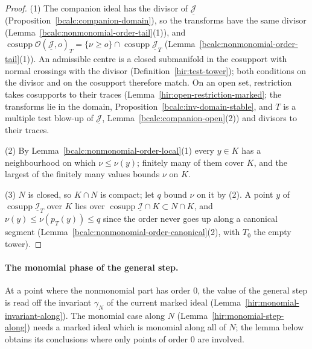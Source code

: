 \begin{proof}
\mixedleanok
(1) The companion ideal has the divisor of \(\underline{\mathcal J}\) (Proposition~\ref{bcalc:companion-domain}), so the transforms have the same divisor
(Lemma~\ref{bcalc:nonmonomial-order-tail}(1)), and \(\operatorname{cosupp}\mathcal O(\underline{\mathcal J},o)_T=\{\nu\ge o\}\cap\operatorname{cosupp}\underline{\mathcal J}_T\)
(Lemma~\ref{bcalc:nonmonomial-order-tail}(1)). An admissible centre is a closed submanifold in the cosupport with normal crossings with the divisor
(Definition~\ref{hir:test-tower}); both conditions on the divisor and on the cosupport therefore match. On an open set, restriction takes cosupports to their traces
(Lemma~\ref{hir:open-restriction-marked}; the transforms lie in the domain, Proposition~\ref{bcalc:inv-domain-stable}, and \(T\) is a multiple test blow-up of
\(\underline{\mathcal J}\), Lemma~\ref{bcalc:companion-open}(2)) and divisors to their traces.

(2) By Lemma~\ref{bcalc:nonmonomial-order-local}(1) every \(y\in K\) has a neighbourhood on which \(\nu\le\nu(y)\); finitely many of them cover \(K\), and the largest of the
finitely many values bounds \(\nu\) on \(K\).

(3) \(N\) is closed, so \(K\cap N\) is compact; let \(q\) bound \(\nu\) on it by (2). A point \(y\) of \(\operatorname{cosupp}\underline{\mathcal I}_T\) over \(K\) lies over
\(\operatorname{cosupp}\underline{\mathcal I}\cap K\subset N\cap K\), and \(\nu(y)\le\nu(p_T(y))\le q\) since the order never goes up along a canonical segment
(Lemma~\ref{bcalc:nonmonomial-order-canonical}(2), with \(T_0\) the empty tower).
\end{proof}

\paragraph{The monomial phase of the general step.} At a point where the nonmonomial part has order \(0\), the value of the general step is read off
the invariant \(\gamma_N\) of the current marked ideal (Lemma~\ref{hir:monomial-invariant-along}). The monomial case along \(N\) (Lemma~\ref{hir:monomial-step-along})
needs a marked ideal which is monomial along all of \(N\); the lemma below obtains its conclusions where only points of order \(0\) are involved.

